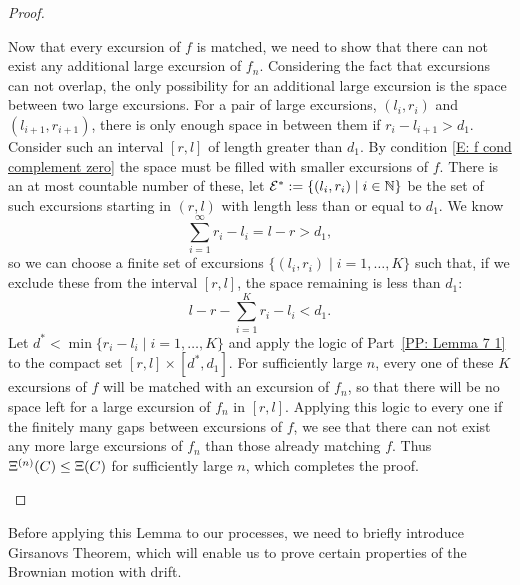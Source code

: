 \begin{proof}
\begin{proofpart} \label{PP: Lemma 7 2}

Now that every excursion of $f$ is matched, 
we need to show that there can not exist any additional large excursion of $f_n$.
Considering the fact that excursions can not overlap,
the only possibility for an additional large excursion is the space between two large excursions.
For a pair of large excursions,
$(l_i, r_i)$ and $(l_{i+1}, r_{i+1})$,
there is only enough space in between them if
$r_i - l_{i+1} > d_1$.
Consider such an interval $[r,l]$ of length greater than $d_1$.
By condition \eqref{E: f cond complement zero} the space must be filled with smaller excursions of $f$.
There is an at most countable number of these,
let $\mathcal{E^*} := \{ (l_i, r_i) \; | \; i \in \mathbb{N} \}$
be the set of such excursions starting in $(r,l)$ with length less than or equal to $d_1$.
We know
\begin{equation} 
\sum_{i=1}^{\infty} r_i - l_i = l - r > d_1,
\end{equation}
so we can choose a finite set of excursions
$\{ (l_i, r_i) \; | \; i = 1, \dots, K \}$
such that, 
if we exclude these from the interval $[r,l]$, 
the space remaining is less than $d_1$:
\begin{equation}
l-r - \sum_{i=1}^{K} r_i - l_i < d_1.
\end{equation}
Let $d^* < \min \{ r_i - l_i \; | \; i = 1, \dots, K \}$
and apply the logic of Part~\ref{PP: Lemma 7 1} to the compact set
$[r, l] \times [d^*, d_1]$.
For sufficiently large $n$, 
every one of these $K$ excursions of $f$ will be matched with an excursion of $f_n$,
so that there will be no space left for a large excursion of $f_n$ in $[r,l]$.
Applying this logic to every one if the finitely many gaps between excursions of $f$,
we see that there can not exist any more large excursions of $f_n$  than those already matching $f$.
Thus $\Xi^{(n)}(C) \leq \Xi(C)$ for sufficiently large $n$,
which completes the proof.
\end{proofpart}

\end{proof}

Before applying this Lemma to our processes, we need to briefly introduce Girsanovs Theorem,
which will enable us to prove certain properties of the Brownian motion with drift.

